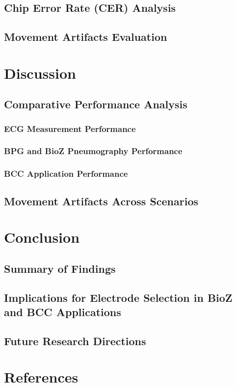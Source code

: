 \documentclass[conference]{IEEEtran}
\begin{document}
\subsection{Chip Error Rate (CER) Analysis}
\subsection{Movement Artifacts Evaluation}

\section{Discussion}
\subsection{Comparative Performance Analysis}
\subsubsection{ECG Measurement Performance}
\subsubsection{BPG and BioZ Pneumography Performance}
\subsubsection{BCC Application Performance}
\subsection{Movement Artifacts Across Scenarios}

\section{Conclusion}
\subsection{Summary of Findings}
\subsection{Implications for Electrode Selection in BioZ and BCC Applications}
\subsection{Future Research Directions}

\section*{References}




\end{document}
